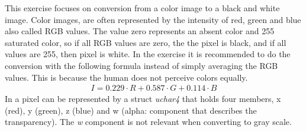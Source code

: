 This exercise focuses on conversion from a color image to a black and white image.
Color images, are often represented by the intensity of red, green and blue also called RGB values.
The value zero represents an absent color and 255 saturated color, so if all RGB values are zero, the the pixel is black, and if all values are 255, then pixel is white.
In the exercise it is recommended to do the conversion with the following formula instead of simply averaging the RGB values.
This is because the human does not perceive colors equally.
\begin{align*}
I = 0.229\cdot R + 0.587\cdot G + 0.114\cdot B
\end{align*} 
In \cuda{} a pixel can be represented by a struct \textit{uchar4} that holds four members, x (red), y (green), z (blue) and w (alpha: component that describes the transparency).
The \textit{w} component is not relevant when converting to gray scale.

